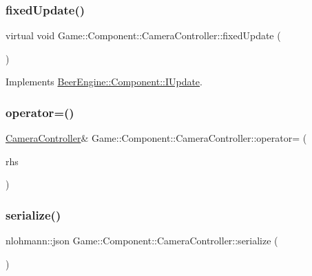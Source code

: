 \subsubsection{\texorpdfstring{fixed\+Update()}{fixedUpdate()}}
{\footnotesize\ttfamily virtual void Game\+::\+Component\+::\+Camera\+Controller\+::fixed\+Update (\begin{DoxyParamCaption}\item[{void}]{ }\end{DoxyParamCaption})\hspace{0.3cm}{\ttfamily [virtual]}}



Implements \mbox{\hyperlink{class_beer_engine_1_1_component_1_1_i_update_a615c127a4729f73713e5eaeee538854b}{Beer\+Engine\+::\+Component\+::\+I\+Update}}.

\mbox{\label{class_game_1_1_component_1_1_camera_controller_a5b4d4521b4ceeba0f98ba3663015725c}} 
\subsubsection{\texorpdfstring{operator=()}{operator=()}}
{\footnotesize\ttfamily \mbox{\hyperlink{class_game_1_1_component_1_1_camera_controller}{Camera\+Controller}}\& Game\+::\+Component\+::\+Camera\+Controller\+::operator= (\begin{DoxyParamCaption}\item[{\mbox{\hyperlink{class_game_1_1_component_1_1_camera_controller}{Camera\+Controller}} const \&}]{rhs }\end{DoxyParamCaption})}

\mbox{\label{class_game_1_1_component_1_1_camera_controller_a1a7f36bf3f1f25b0edd404146f0c3289}} 
\subsubsection{\texorpdfstring{serialize()}{serialize()}}
{\footnotesize\ttfamily nlohmann\+::json Game\+::\+Component\+::\+Camera\+Controller\+::serialize (\begin{DoxyParamCaption}{ }\end{DoxyParamCaption})\hspace{0.3cm}{\ttfamily [virtual]}}



